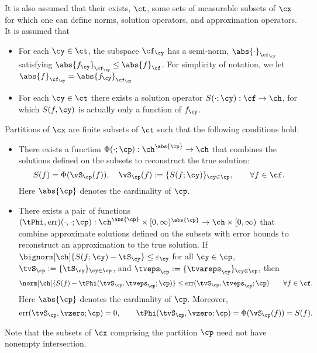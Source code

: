 \documentclass[final]{elsarticle}
\newcommand{\Fnorm}[1]{\abs{#1}_{\cf}}
\newcommand{\FYnorm}[1]{\abs{#1}_{\cf_{\cy}}}
\newcommand{\Hnorm}[1]{\norm[\ch]{#1}}
\theoremstyle{definition}
\theoremstyle{remark}
\DeclareMathOperator{\err}{err}
\begin{document}
It is also assumed that their exists, $\ct$, some sets of measurable subsets of $\cx$ for which one can define norms, solution operators, and approximation operators.  It is assumed that 
\begin{itemize}
\item For each $\cy \in \ct$, the subspace  $\cf_{\cy}$ has a semi-norm, $\FYnorm{\cdot}$ satisfying $\FYnorm{f_{\cy}} \le \Fnorm{f}$. For simplicity of notation, we let $\FYnorm{f} = \FYnorm{f_{\cy}}$

\item For each $\cy \in \ct$ there exists a solution operator $S(\cdot;\cy) : \cf \to \ch$, for which $S(f,\cy)$ is actually only a function of $f_{\cy}$.

\end{itemize}
Partitions of $\cx$ are finite subsets of $\ct$ such that the following conditions hold:
\begin{itemize}
\item There exists a function $\Phi(\cdot; \cp): \ch^{\abs{\cp}} \to \ch$ that combines the solutions defined on the subsets to reconstruct the true solution:
\[
S(f) = \Phi(\vS_{\cp}(f)), \quad \vS_{\cp}(f):= \{S(f;\cy)\}_{\cy \in \cp}, \qquad \forall f \in \cf.
\]
Here $\abs{\cp}$ denotes the cardinality of $\cp$.  

\item There exists a pair of functions $(\tPhi,\err)(\cdot,\cdot; \cp): \ch^{\abs{\cp}} \times [0,\infty)^{\abs{\cp}} \to \ch \times [0,\infty)$ that combine approximate solutions defined on the subsets with error bounds to reconstruct an approximation to the true solution. If $\bignorm[\ch]{S(f;\cy) - \tS_{\cy}} \le \varepsilon_{\cy}$ for all $\cy \in \cp$, $\tvS_{\cp} := \{\tS_{\cy}\}_{\cy \in \cp}$,  and $\tveps_{\cp} := \{\tvareps_{\cy}\}_{\cy \in \cp}$, then
\begin{equation*}
\Hnorm{S(f) -  \tPhi(\tvS_{\cp}, \tveps_{\cp} ;\cp)} \le \err(\tvS_{\cp}, \tveps_{\cp} ;\cp) \qquad \forall f \in \cf.
\end{equation*}
Here $\abs{\cp}$ denotes the cardinality of $\cp$. Moreover, 
\[
\err(\tvS_{\cp}, \vzero ;\cp) = 0, \qquad \tPhi(\tvS_{\cp}, \vzero ;\cp) = \Phi(\vS_{\cp}(f)) = S(f).
\]
\end{itemize}
Note that the subsets of $\cx$ comprising the partition $\cp$ need not have nonempty intersection.
\end{document}
